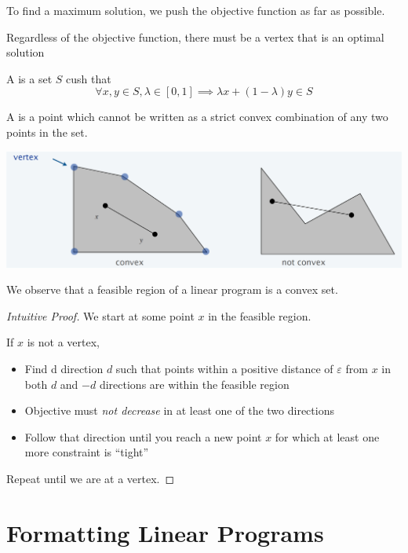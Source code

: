 To find a maximum solution, we push the objective function as far as possible. 

\begin{claim}
    Regardless of the objective function, there must be a vertex that is an optimal solution
\end{claim}

\begin{remark}[Convexity]
    A  is a set $S$ cush that \[
        \forall x, y \in S, \lambda \in [0, 1] \implies \lambda x + (1 - \lambda)y \in S
    \]

    A  is a point which cannot be written as a strict convex combination of any two points in the set.

    \begin{center}
        \includegraphics[width=\linewidth]{figures/convexity.png}
    \end{center}

    We observe that a feasible region of a linear program is a convex set.
\end{remark}

\begin{proof}[Intuitive Proof]
    We start at some point $x$ in the feasible region. 

    If $x$ is not a vertex, 
    \begin{itemize}
        \item Find d direction $d$ such that points within a positive distance of $\varepsilon$ from $x$ in both $d$ and $-d$ directions are within the feasible region
        \item Objective must \textit{not decrease} in at least one of the two directions
        \item Follow that direction until you reach a new point $x$ for which at least one more constraint is ``tight''
    \end{itemize}

    Repeat until we are at a vertex. 
\end{proof}

\section{Formatting Linear Programs}

